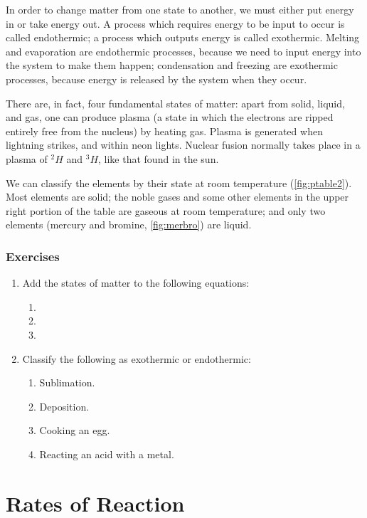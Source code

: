 \documentclass[a4paper]{memoir}
\begin{document}
In order to change matter from one state to another, we must either put energy in or take energy out. A process which requires energy to be input
to occur is called endothermic; a process which outputs energy is called exothermic. Melting and evaporation are endothermic processes, because we need
to input energy into the system to make them happen; condensation and freezing are exothermic processes, because energy is released by the system when
they occur.

There are, in fact, four fundamental states of matter: apart from solid, liquid, and gas, one can produce plasma (a state in which the electrons are ripped
entirely free from the nucleus) by heating gas. Plasma is generated when lightning strikes, and within neon lights. Nuclear fusion normally takes place
in a plasma of $ ^2H $ and $ ^3H $, like that found in the sun.

We can classify the elements by their state at room temperature (\cref{fig:ptable2}). Most elements are solid; the noble gases and some other elements in the
upper right portion of the table are gaseous at room temperature; and only two elements (mercury and bromine, \cref{fig:merbro}) are liquid.

\subsection*{Exercises}
\begin{enumerate}
  \item Add the states of matter to the following equations:
    \begin{enumerate}
      \item {}
      \item {}
      \item {}
    \end{enumerate}
  \item Classify the following as exothermic or endothermic:
    \begin{enumerate}
      \item Sublimation.
      \item Deposition.
      \item Cooking an egg.
      \item Reacting an acid with a metal.
    \end{enumerate}
\end{enumerate}

\chapter{Rates of Reaction}
\end{document}
